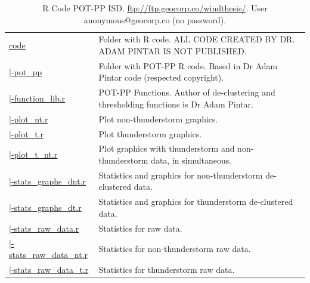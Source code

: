 \documentclass[12pt,twoside]{reedthesis}
\begin{document}
\begingroup\fontsize{7}{9}\selectfont
\begin{longtable}[t]{>{\raggedright\arraybackslash}p{1.3in}>{\raggedright\arraybackslash}p{4.9in}}
\caption[R Code POT-PP ISD]{\label{tab:codeisd}R Code POT-PP ISD. \href{ftp://ftp.geocorp.co/windthesis/}{ftp://ftp.geocorp.co/windthesis/}. User anonymous@geocorp.co (no password).}\\
\toprule
\multicolumn{1}{l}{Folder Tree - Ftp Links} & \multicolumn{1}{l}{Description}\\
\midrule
\href{ftp://ftp.geocorp.co/windthesis/code/}{code} & Folder with R code. ALL CODE CREATED BY DR. ADAM PINTAR IS NOT PUBLISHED.\\
\href{ftp://ftp.geocorp.co/windthesis/code/pot_pp/}{\;\;|-pot\_pp} & Folder with POT-PP R code. Based in Dr Adam Pintar code (respected copyright).\\
\href{ftp://ftp.geocorp.co/windthesis/code/pot_pp/function_lib.r}{\;\;\;\;|-function\_lib.r} & POT-PP Functions. Author of de-clustering and thresholding functions is Dr Adam Pintar.\\
\href{ftp://ftp.geocorp.co/windthesis/code/pot_pp/plot_nt.r}{\;\;\;\;|-plot\_nt.r} & Plot non-thunderstorm graphics.\\
\href{ftp://ftp.geocorp.co/windthesis/code/pot_pp/plot_t.r}{\;\;\;\;|-plot\_t.r} & Plot thunderstorm graphics.\\
\href{ftp://ftp.geocorp.co/windthesis/code/pot_pp/plot_t_nt.r}{\;\;\;\;|-plot\_t\_nt.r} & Plot graphics with thunderstorm and non-thunderstorm data, in simultaneous.\\
\href{ftp://ftp.geocorp.co/windthesis/code/pot_pp/statistics_and_graphics_declustered_nt.r}{\;\;\;\;|-stats\_graphs\_dnt.r} & Statistics and graphics for non-thunderstorm de-clustered data.\\
\href{ftp://ftp.geocorp.co/windthesis/code/pot_pp/statistics_and_graphics_declustered_t.r}{\;\;\;\;|-stats\_graphs\_dt.r} & Statistics and graphics for thunderstorm de-clustered data.\\
\href{ftp://ftp.geocorp.co/windthesis/code/pot_pp/statistics_raw_data.r}{\;\;\;\;|-stats\_raw\_data.r} & Statistics for raw data.\\
\href{ftp://ftp.geocorp.co/windthesis/code/pot_pp/statistics_raw_data_nt.r}{\;\;\;\;|-stats\_raw\_data\_nt.r} & Statistics for non-thunderstorm raw data.\\
\href{ftp://ftp.geocorp.co/windthesis/code/pot_pp/statistics_raw_data_t.r}{\;\;\;\;|-stats\_raw\_data\_t.r} & Statistics for thunderstorm raw data.\\

\end{longtable}
\end{document}
